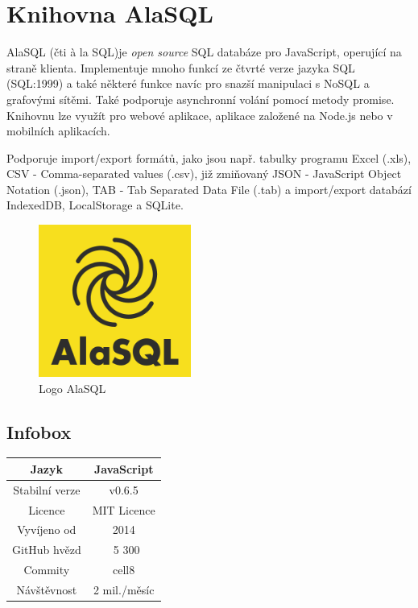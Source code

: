 \documentclass[a4, titlepage]{article}
\begin{document}
\section{Knihovna AlaSQL}
AlaSQL (čti à la SQL)je \textit{open source} SQL databáze pro JavaScript, operující na straně klienta. Implementuje mnoho funkcí ze čtvrté verze jazyka SQL (SQL:1999) a také některé funkce navíc pro snazší manipulaci s NoSQL a grafovými sítěmi. Také podporuje asynchronní volání pomocí metody promise. Knihovnu lze využít pro webové aplikace, aplikace založené na Node.js nebo v mobilních aplikacích.

Podporuje import/export formátů, jako jsou např. tabulky programu Excel (.xls), CSV - Comma-separated values (.csv), již zmiňovaný JSON - JavaScript Object Notation (.json), TAB - Tab Separated Data File (.tab) a import/export databází IndexedDB, LocalStorage a SQLite.

\begin{figure}[h]
    \centering
    \includegraphics[width=5cm]{alasql_logo}
    \caption{Logo AlaSQL}
\end{figure}


\subsection{Infobox}
\begin{center}
\begin{tabular}{ ||c|c|| }
\hline
 Jazyk & JavaScript \\
 \hline
 Stabilní verze & v0.6.5 \\
 \hline
 Licence & MIT Licence \\
 \hline
 Vyvíjeno od & 2014 \\
 \hline
 GitHub hvězd & ~5 300 \\
 \hline
 Commity & cell8 \\
 \hline
 Návštěvnost & 2 mil./měsíc  \\
 \hline
\end{tabular}
\end{center}
\end{document}
